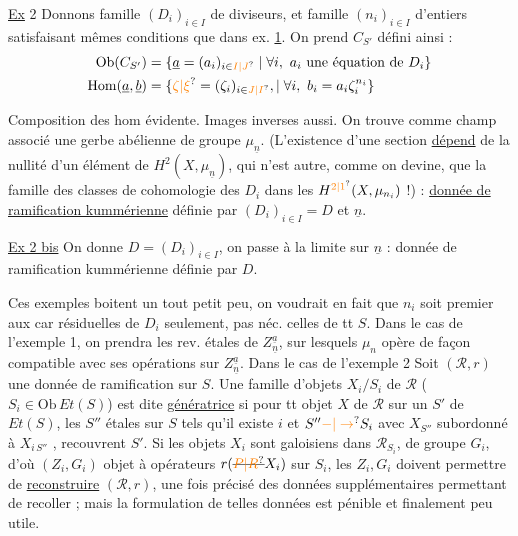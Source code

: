 \uline{Ex} 2 Donnons famille $(D_i)_{i\in I}$ de diviseurs, et famille $(n_i)_{i\in I}$ d'entiers satisfaisant mêmes conditions que dans ex. \uline{1}. On prend
$C_{S'}$ défini ainsi :
\[
\begin{aligned}
\mathrm{Ob}(C_{S'})&=\{\underline a=(a_i)_{i\in\unsure{I|J}}\mid \forall i,\ a_i\ \text{une équation de }D_i\}\\
\mathrm{Hom}(\underline a,\underline b)&=\{\unsure{\zeta|\xi}=(\zeta_i)_{i\in\unsure{J|I}},\mid\forall i,\ b_i=a_i\zeta_i^{n_i}\}
\end{aligned}
\]

 Composition des hom évidente. Images inverses aussi. On trouve comme champ associé une gerbe abélienne de groupe $\mu_{\underline n}$. (L'existence d'une section \uline{dépend} de la nullité d'un élément de $H^2(X,\mu_{\underline n})$, qui n'est autre, comme on devine, que la famille des classes de cohomologie des $D_i$ dans les $H^{\unsure{2|1}}(X,\mu_{n_i})$ !) : \uline{donnée de ramification kummérienne} définie par $(D_i)_{i\in I}=D$ et $\underline n$.

\uline{Ex 2 bis} On donne $D=(D_i)_{i\in I}$, on passe à la limite sur $\underline n$ : donnée de ramification kummérienne définie par $D$.

Ces exemples boitent un tout petit peu, on voudrait en fait que $n_i$ soit premier aux car résiduelles de $D_i$ seulement, pas néc. celles de tt $S$. Dans le cas de l'exemple 1, on prendra les rev. étales de $Z_{\underline n}^{\underline a}$, sur lesquels $\mu_n$ opère de façon compatible avec ses opérations sur $Z_{\underline n}^{\underline a}$. Dans le cas de l'exemple 2
Soit $(\mathscr R,r)$ une donnée de ramification sur $S$. Une famille d'objets $X_i/S_i$ de $\mathscr R$ ($S_i\in\mathrm{Ob}\,Et(S)$) est dite \uline{génératrice} si pour tt objet $X$ de $\mathscr R$ sur un $S'$ de $Et(S)$, les $S''$ étales sur $S$ tels qu'il existe $i$ et $S''\unsure{-|\to}S_i$ avec $X_{S''}$ subordonné à $X_{i\,S''}$ , recouvrent $S'$.
Si  les objets $X_i$ sont galoisiens dans $\mathscr R_{S_i}$,  de groupe $G_i$, d'où $(Z_i,G_i)$ objet à opérateurs $r(\deleted{\unsure{P|R}}X_i)$ sur $S_i$, les $Z_i,G_i$ doivent permettre de \uline{reconstruire} $(\mathscr R,r)$, une fois précisé des données supplémentaires permettant de recoller ; mais la formulation de telles données est pénible et finalement peu utile.

